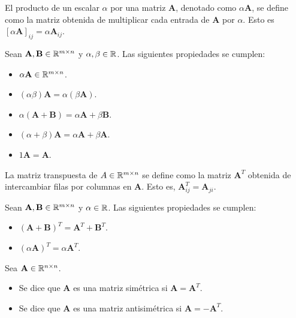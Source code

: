 \begin{defi}
El producto de un escalar $\alpha$ por una matriz $\mathbf{A}$, denotado como $\alpha \mathbf{A}$, se define como la matriz obtenida de multiplicar cada entrada de $\mathbf{A}$ por $\alpha$. Esto es $[\alpha\mathbf{A}]_{ij} = \alpha \mathbf{A}_{ij}$.
\end{defi}

\begin{prop}
Sean $\mathbf{A}, \mathbf{B} \in \mathbb{R}^{m \times n}$ y $\alpha, \beta \in \mathbb{R}$. Las siguientes propiedades se cumplen:

\begin{itemize}
\item $\alpha \mathbf{A} \in \mathbb{R}^{m \times n}$.
\item $(\alpha \beta) \mathbf{A} = \alpha (\beta \mathbf{A})$.
\item $\alpha(\mathbf{A} + \mathbf{B}) = \alpha \mathbf{A} + \beta \mathbf{B}$.
\item $(\alpha + \beta)\mathbf{A} = \alpha \mathbf{A} + \beta \mathbf{A}$.
\item $1 \mathbf{A} = \mathbf{A}$.
\end{itemize}
\end{prop}

\begin{defi}
La matriz transpuesta de $A \in \mathbb{R}^{m \times n}$ se define como la matriz $\mathbf{A}^T$ obtenida de intercambiar filas por columnas en $\mathbf{A}$. Esto es, $\mathbf{A}^T_{ij} = \mathbf{A}_{ji}$.
\end{defi}

\begin{prop}
Sean $\mathbf{A}, \mathbf{B} \in \mathbb{R}^{m \times n}$ y $\alpha \in \mathbb{R}$. Las siguientes propiedades se cumplen:

\begin{itemize}
\item $(\mathbf{A} + \mathbf{B})^T = \mathbf{A}^T + \mathbf{B}^T$.
\item $(\alpha \mathbf{A})^T = \alpha \mathbf{A}^T$.
\end{itemize}
\end{prop}

\begin{defi}
Sea $\mathbf{A} \in \mathbb{R}^{n\times n}$.

\begin{itemize}
\item Se dice que $\mathbf{A}$ es una matriz simétrica si $\mathbf{A} = \mathbf{A}^T$.
\item Se dice que $\mathbf{A}$ es una matriz antisimétrica si $\mathbf{A} = -\mathbf{A}^T$.
\end{itemize}
\end{defi}

